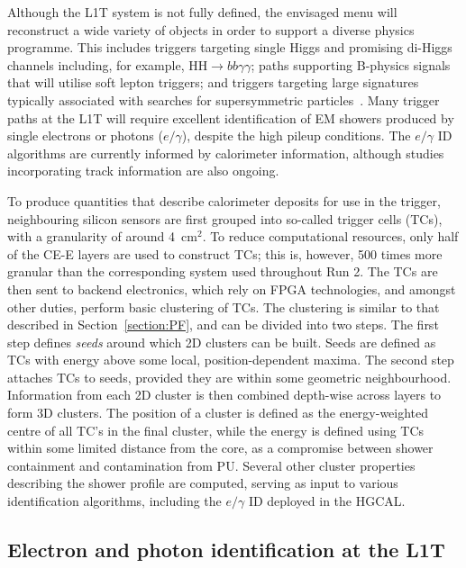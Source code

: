 Although the L1T system is not fully defined, the envisaged menu will reconstruct a wide variety of objects in order to support a diverse physics programme. This includes triggers targeting single Higgs and promising di-Higgs channels including, for example, $\mathrm{HH}\rightarrow bb\gamma\gamma$; paths supporting B-physics signals that will utilise soft lepton triggers; and triggers targeting large \met signatures typically associated with searches for supersymmetric particles~\cite{CMS_phase2_L1T}.
Many trigger paths at the L1T will require excellent identification of EM showers produced by single electrons or photons ($e/\gamma$), despite the high pileup conditions. The $e/\gamma$ ID algorithms are currently informed by calorimeter information, although studies incorporating track information are also ongoing.

To produce quantities that describe calorimeter deposits for use in the trigger, neighbouring silicon sensors are first grouped into so-called trigger cells (TCs), with a granularity of around 4~$\mathrm{cm}^{2}$. To reduce computational resources, only half of the CE-E layers are used to construct TCs; this is, however, 500 times more granular than the corresponding system used throughout Run 2. The TCs are then sent to backend electronics, which rely on FPGA technologies, and amongst other duties, perform basic clustering of TCs. The clustering is similar to that described in Section~\ref{section:PF}, and can be divided into two steps. The first step defines \textit{seeds} around which 2D clusters can be built. Seeds are defined as TCs with energy above some local, position-dependent maxima. The second step attaches TCs to seeds, provided they are within some geometric neighbourhood. Information from each 2D cluster is then combined depth-wise across layers to form 3D clusters. The position of a cluster is defined as the energy-weighted centre of all TC's in the final cluster, while the energy is defined using TCs within some limited distance from the core, as a compromise between shower containment and contamination from PU. Several other cluster properties describing the shower profile are computed, serving as input to various identification algorithms, including the $e/\gamma$ ID deployed in the HGCAL.

\subsection{Electron and photon identification at the L1T}

